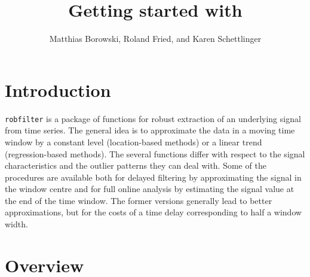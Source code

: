 \documentclass[a4paper]{scrartcl}
\title{Getting started with \robfilter}
\author{Matthias Borowski, Roland Fried, and Karen Schettlinger}
\date{}
\newcommand*{\robfilter}{\texttt{robfilter} }
\begin{document}
\maketitle

\section{Introduction}

\robfilter is a package of functions for robust extraction of an underlying signal from time series.
The general idea is to approximate the data in a moving time
window by a constant level (location-based methods) or a linear
trend (regression-based methods). The several functions differ
with respect to the signal characteristics and the outlier
patterns they can deal with. Some of the procedures are available
both for delayed filtering by approximating the signal in the
window centre and for full online analysis by estimating the
signal value at the end of the time window. The former versions
generally lead to better approximations, but for the costs of a
time delay corresponding to half a window width.

\section{Overview}
\end{document}
